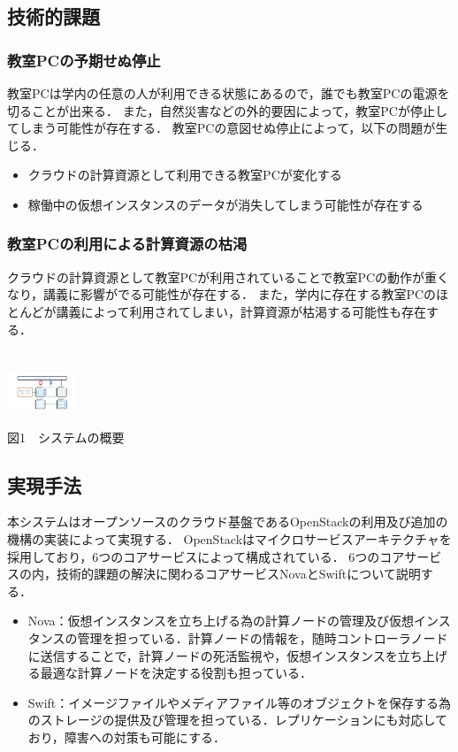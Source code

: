 \documentclass[11pt,a4paper]{jsarticle}
\begin{document}
\subsection{技術的課題}
\subsubsection{教室PCの予期せぬ停止}
教室PCは学内の任意の人が利用できる状態にあるので，誰でも教室PCの電源を切ることが出来る．
また，自然災害などの外的要因によって，教室PCが停止してしまう可能性が存在する．
教室PCの意図せぬ停止によって，以下の問題が生じる．
\begin{itemize}
	\item クラウドの計算資源として利用できる教室PCが変化する
	\item 稼働中の仮想インスタンスのデータが消失してしまう可能性が存在する
\end{itemize}
\subsubsection{教室PCの利用による計算資源の枯渇}
クラウドの計算資源として教室PCが利用されていることで教室PCの動作が重くなり，講義に影響がでる可能性が存在する．
また，学内に存在する教室PCのほとんどが講義によって利用されてしまい，計算資源が枯渇する可能性も存在する．
\\
\\
\\
\includegraphics[width=2.1cm, bb=0 0 300 400]{graph1.pdf}
\begin{center}図1　システムの概要\end{center}

\subsection{実現手法}
本システムはオープンソースのクラウド基盤であるOpenStack\cite{openstack}の利用及び追加の機構の実装によって実現する．
OpenStackはマイクロサービスアーキテクチャを採用しており，6つのコアサービスによって構成されている．
6つのコアサービスの内，技術的課題の解決に関わるコアサービスNovaとSwiftについて説明する．
\begin{itemize}
	\item Nova：仮想インスタンスを立ち上げる為の計算ノードの管理及び仮想インスタンスの管理を担っている．計算ノードの情報を，随時コントローラノードに送信することで，計算ノードの死活監視や，仮想インスタンスを立ち上げる最適な計算ノードを決定する役割も担っている．
	\item Swift：イメージファイルやメディアファイル等のオブジェクトを保存する為のストレージの提供及び管理を担っている．レプリケーションにも対応しており，障害への対策も可能にする．
\end{itemize}
\end{document}
